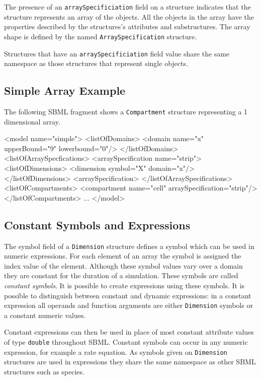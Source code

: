 \documentclass{cekarticle}
\begin{document}
The presence of an \texttt{arraySpecificiation} field on a
structure indicates that the structure represents an array of the
objects.  All the objects in the array have the properties
described by the structures's attributes and substructures. The
array shape is defined by the named \texttt{ArraySpecification}
structure.

Structures that have an \texttt{arraySpecificiation} field value
share the same namespace as those structures that represent
single objects.

\subsection{Simple Array Example}
\label{sec:simplearrayeg}

The following SBML fragment shows a \texttt{Compartment}
structure representing a 1 dimensional array.

\begin{example}
<model name="simple">
    <listOfDomains>
        <domain name="x" upperBound="9" lowerbound="0"/>
    </listOfDomains>
    <listOfArraySpecfications>
        <arraySpecification name="strip">
            <listOfDimensions>
                <dimension symbol="X" domain="x"/>
            </listOfDimensions>
        <arraySpecification>
    </listOfArraySpecifications>
    <listOfCompartments>
        <compartment name="cell" arraySpecification="strip"/>
    </listOfCompartments>
    ...
</model>
\end{example}

\subsection{Constant Symbols and Expressions}
\label{sec:constantExpressions}

The symbol field of a \texttt{Dimension} structure defines a
symbol which can be used in numeric expressions.  For each element
of an array the symbol is assigned the index value of the element.
Although these symbol values vary over a domain they are constant
for the duration of a simulation.  These symbols are called
\emph{constant symbols}. It is possible to create expressions
using these symbols. It is possible to distinguish between constant and
dynamic expressions: in a constant expression all operands and
function arguments are either \texttt{Dimension} symbols or a
constant numeric values.

Constant expressions can then be used in place of most constant
attribute values of type \texttt{double} throughout SBML.
Constant symbols can occur in any numeric expression, for example
a rate equation. As symbols given on \texttt{Dimension}
structures are used in expressions they share the same namespace
as other SBML structures such as species.
\end{document}
